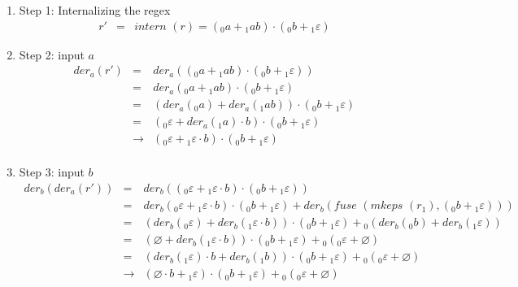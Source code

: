\documentclass[12pt]{article}
\newcommand{\der}{\textit{der}}
\newcommand{\fuse}{\textit{fuse }}
\newcommand{\mkeps}{\textit{mkeps }}
\newcommand{\intern}{\textit{intern }}
\begin{document}
\begin{enumerate}
  \item Step 1: Internalizing the regex
  \[
    \begin{array}{rcl}
    r' & = & \intern(r) = ({}_0a + {}_1ab) \cdot ({}_0b + {}_1\varepsilon)
    \end{array}
  \]

  \item Step 2: input $a$
    \[
    \begin{array}{rcl}
    \der_a (r') & =           & \der_a(({}_0a + {}_1ab) \cdot ({}_0b + {}_1\varepsilon))\\
                & =           & \der_a({}_0a + {}_1ab) \cdot ({}_0b + {}_1\varepsilon)\\
                & =           & (\der_a({}_0a) + \der_a({}_1ab)) \cdot ({}_0b + {}_1\varepsilon)\\
                & =           & ({}_0\varepsilon + \der_a({}_1a) \cdot b ) \cdot ({}_0b + {}_1\varepsilon)\\
                & \rightarrow & ({}_0\varepsilon + {}_1\varepsilon \cdot b) \cdot ({}_0b + {}_1\varepsilon)\\
    \end{array}
    \]

  \item Step 3: input $b$
  \[
    \begin{array}{rcl}
    \der_b(\der_a(r')) & =           & \der_b(({}_0\varepsilon + {}_1\varepsilon \cdot b) \cdot ({}_0b + {}_1\varepsilon))\\
                       & =           & \der_b({}_0\varepsilon + {}_1\varepsilon \cdot b) \cdot ({}_0b + {}_1\varepsilon) + \der_b(\fuse(\mkeps(r_1),({}_0b + {}_1\varepsilon))) \\
                       & =           & (\der_b({}_0\varepsilon) + \der_b({}_1\varepsilon \cdot b)) \cdot ({}_0b + {}_1\varepsilon) + {}_0(\der_b({}_0b) + \der_b({}_1\varepsilon)) \\
                       & =           & (\varnothing + \der_b({}_1\varepsilon \cdot b)) \cdot ({}_0b + {}_1\varepsilon) + {}_0({}_0\varepsilon + \varnothing) \\
                       & =           & (\der_b({}_1\varepsilon)\cdot b + \der_b({}_1b)) \cdot ({}_0b + {}_1\varepsilon) + {}_0({}_0\varepsilon + \varnothing) \\
                       & \rightarrow & (\varnothing \cdot b + {}_1\varepsilon) \cdot ({}_0b + {}_1\varepsilon) + {}_0({}_0\varepsilon + \varnothing) \\
    \end{array}
  \]

\end{enumerate}
\end{document}
